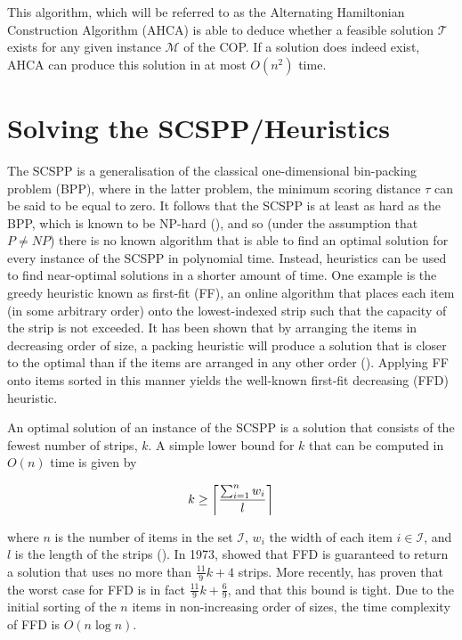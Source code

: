 \documentclass[oribibl]{llncs}
\begin{document}
This algorithm, which will be referred to as the Alternating Hamiltonian Construction Algorithm (AHCA) is able to deduce whether a feasible solution $\mathcal{T}$ exists for any given instance $\mathcal{M}$ of the COP. If a solution does indeed exist, AHCA can produce this solution in at most $O(n^2)$ time.

\section{Solving the SCSPP/Heuristics}
\label{sec:scsppsoln}
The SCSPP is a generalisation of the classical one-dimensional bin-packing problem (BPP), where in the latter problem, the minimum scoring distance $\tau$ can be said to be equal to zero. It follows that the SCSPP is at least as hard as the BPP, which is known to be NP-hard (\citealp{garey1979}), and so (under the assumption that $P \neq NP$) there is no known algorithm that is able to find an optimal solution for every instance of the SCSPP in polynomial time. Instead, heuristics can be used to find near-optimal solutions in a shorter amount of time. One example is the greedy heuristic known as first-fit (FF), an online algorithm that places each item (in some arbitrary order) onto the lowest-indexed strip such that the capacity of the strip is not exceeded. It has been shown that by arranging the items in decreasing order of size, a packing heuristic will produce a solution that is closer to the optimal than if the items are arranged in any other order (\citealp{johnson1974fast}). Applying FF onto items sorted in this manner yields the well-known first-fit decreasing (FFD) heuristic.

An optimal solution of an instance of the SCSPP is a solution that consists of the fewest number of strips, $k$. A simple lower bound for $k$ that can be computed in $O(n)$ time is given by

\begin{equation}
	\label{eqn:lowerbound}
	k \geq \ceil*{\frac{\sum_{i=1}^{n}w_i}{l}}
\end{equation}

where $n$ is the number of items in the set $\mathcal{I}$, $w_i$ the width of each item $i \in \mathcal{I}$, and $l$ is the length of the strips (\citealp{martello1990b}). In 1973, \citeauthor{johnson1973} showed that FFD is guaranteed to return a solution that uses no more than $\frac{11}{9}k + 4$ strips. More recently, \cite{dosa2007} has proven that the worst case for FFD is in fact $\frac{11}{9}k + \frac{6}{9}$, and that this bound is tight. Due to the initial sorting of the $n$ items in non-increasing order of sizes, the time complexity of FFD is $O(n\log n)$.
\end{document}
